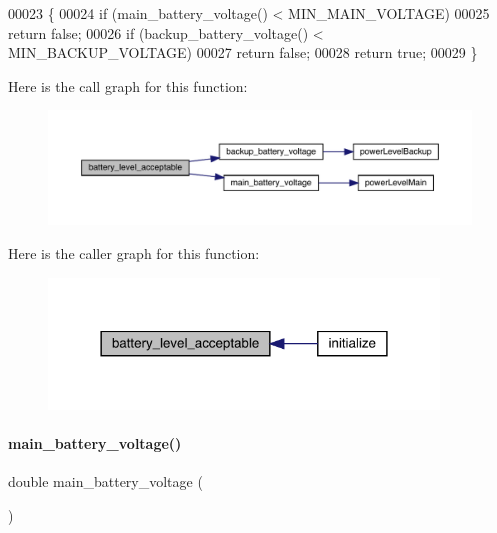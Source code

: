 \begin{DoxyCode}
00023                                 \{
00024   \textcolor{keywordflow}{if} (main_battery_voltage() < MIN\_MAIN\_VOLTAGE)
00025     \textcolor{keywordflow}{return} \textcolor{keyword}{false};
00026   \textcolor{keywordflow}{if} (backup_battery_voltage() < MIN\_BACKUP\_VOLTAGE)
00027     \textcolor{keywordflow}{return} \textcolor{keyword}{false};
00028   \textcolor{keywordflow}{return} \textcolor{keyword}{true};
00029 \}
\end{DoxyCode}
Here is the call graph for this function\+:
\nopagebreak
\begin{figure}[H]
\begin{center}
\leavevmode
\includegraphics[width=350pt]{battery_8h_a1097bbb878f6e2690f8eea6cd231959a_cgraph}
\end{center}
\end{figure}
Here is the caller graph for this function\+:
\nopagebreak
\begin{figure}[H]
\begin{center}
\leavevmode
\includegraphics[width=294pt]{battery_8h_a1097bbb878f6e2690f8eea6cd231959a_icgraph}
\end{center}
\end{figure}
\mbox{\label{battery_8h_a8c92c389534fdb079698cdebeb7f2efa}} 
\paragraph{main\+\_\+battery\+\_\+voltage()}
{\footnotesize\ttfamily double main\+\_\+battery\+\_\+voltage (\begin{DoxyParamCaption}{ }\end{DoxyParamCaption})}



